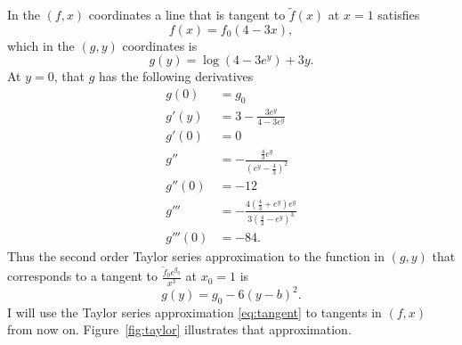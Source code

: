 \documentclass[twocolumn]{article}
\begin{document}
In the $(f,x)$ coordinates a line that is tangent to $\tilde f(x)$ at
$x=1$ satisfies
\begin{equation*}
  f(x) = f_0(4-3x),
\end{equation*}
which in the $(g,y)$ coordinates is
\begin{equation*}
  g(y) = \log \left( 4 - 3e^y \right) + 3y.
\end{equation*}
At $y=0$, that $g$ has the following derivatives
\begin{align*}
  g(0) & = g_0 \\
  g'(y) &= 3 - \frac{3e^y}{4-3e^y} \\
  g'(0) &= 0 \\
  g'' &= -\frac{\frac{4}{3}e^y}{\left( e^y - \frac{4}{3} \right)^2}\\
  g''(0) &= -12 \\
  g''' &= -\frac{4\left( \frac{4}{3} + e^y \right) e^y}{
    3\left( \frac{4}{3} - e^y \right) ^3} \\
  g'''(0) &= -84.
\end{align*}
Thus the second order Taylor series approximation to the function in
$(g,y)$ that corresponds to a tangent to $\frac{\tilde f_0
  e^{g_0}}{x^3}$ at $x_0 = 1$ is
\begin{equation}
  \label{eq:tangent}
  g(y) = g_0 - 6(y-b)^2.
\end{equation}
I will use the Taylor series approximation \eqref{eq:tangent} to
tangents in $(f,x)$ from now on.  Figure~\ref{fig:taylor} illustrates
that approximation.
\end{document}
